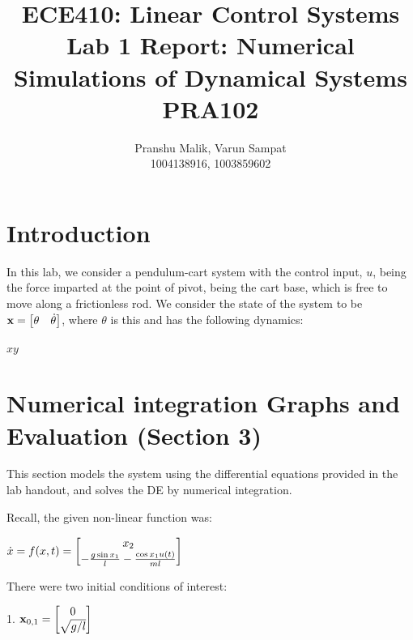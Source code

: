 \documentclass[10pt]{article}
\date{}
\begin{document}
\title{\textbf{\Large{\textsc{ECE410:} Linear Control Systems}} \\ \Large{Lab 1 Report: Numerical Simulations of Dynamical Systems} \\ \textbf{\small{PRA102}}\vspace{-0.3cm}}
\author{Pranshu Malik, Varun Sampat \\ \footnotesize{1004138916}, \footnotesize{1003859602}\vspace{-3cm}}

\maketitle

\section{Introduction}
In this lab, we consider a pendulum-cart system with the control input, $u$, being the force imparted at the point of pivot, being the cart base, which is free to move along a frictionless rod. We consider the state of the system to be $\mathbf{x} = \begin{bmatrix} \theta & \dot{\theta} \end{bmatrix}$, where $\theta$ is this and has the following dynamics:

$x y$
\pendcartsimple

\section{Numerical integration Graphs and Evaluation (Section 3)}
This section models the system using the differential equations provided in the lab handout, and solves the DE by numerical integration. 

Recall, the given non-linear function was:
\begin{center}
   \begin{math}
    \dot{x} = f(x, t) = \begin{bmatrix}  x_2 \\ -\frac{g \sin x_1}{l} - \frac{\cos x_1 u(t)}{ml} \end{bmatrix}
    \end{math} 
\end{center}

There were two initial conditions of interest:
\[
\]
\begin{center}
    1.
    \begin{math}
     \mathbf{x}_{0,1} = \begin{bmatrix}  0\\ \sqrt{g/l}  \end{bmatrix}
    \end{math}
\end{center}
\end{document}
